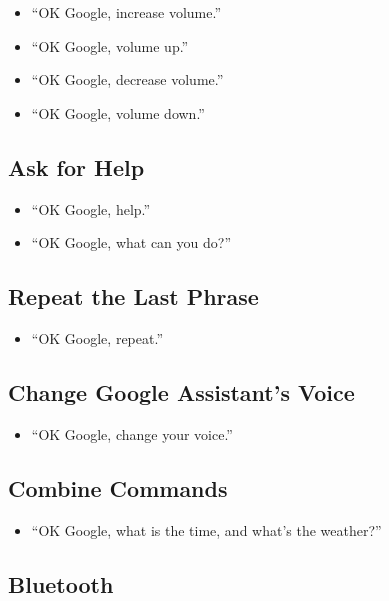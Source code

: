 \documentclass[
  jou,
  floatsintext,
  longtable,
  a4paper,
  nolmodern,
  notxfonts,
  notimes,
  12pt,
  colorlinks=true,linkcolor=blue,citecolor=blue,urlcolor=blue]{apa7}
\providecommand{\tightlist}{%
  \setlength{\itemsep}{0pt}\setlength{\parskip}{0pt}}
\begin{document}
\begin{itemize}
\tightlist
\item
  ``OK Google, increase volume.''
\item
  ``OK Google, volume up.''
\item
  ``OK Google, decrease volume.''
\item
  ``OK Google, volume down.''
\end{itemize}

\subsection{Ask for Help}\label{ask-for-help}

\begin{itemize}
\tightlist
\item
  ``OK Google, help.''
\item
  ``OK Google, what can you do?''
\end{itemize}

\subsection{Repeat the Last Phrase}\label{repeat-the-last-phrase}

\begin{itemize}
\tightlist
\item
  ``OK Google, repeat.''
\end{itemize}

\subsection{Change Google Assistant's
Voice}\label{change-google-assistants-voice}

\begin{itemize}
\tightlist
\item
  ``OK Google, change your voice.''
\end{itemize}

\subsection{Combine Commands}\label{combine-commands}

\begin{itemize}
\tightlist
\item
  ``OK Google, what is the time, and what's the weather?''
\end{itemize}

\subsection{Bluetooth}\label{bluetooth}
\end{document}
